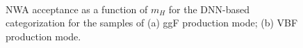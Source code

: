 \begin{figure}[h]
\centering
{}
\\
\caption{NWA acceptance as a function of $m_{H}$ for the DNN-based categorization for the samples of
(a) ggF production mode;
(b) VBF production mode. 
}
\label{fig:hmhzz_acc_dnn}
\end{figure}

